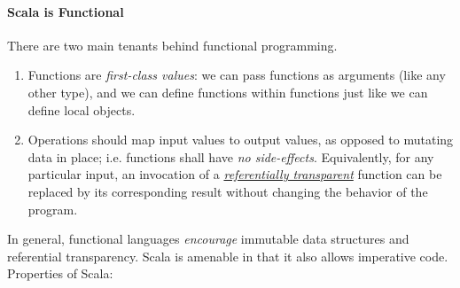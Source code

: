 \documentclass[12pt,letterpaper,twoside]{article}
\begin{document}
\paragraph{Scala is Functional} There are two main tenants behind functional programming.
\begin{enumerate}   \item Functions are \emph{first-class values}: we can pass functions 
    as arguments (like any
    other type), and we can define functions within functions just like we can
    define local objects.
  \item Operations should map input values to output values, as opposed to mutating data
    in place; i.e. functions shall have \emph{no side-effects}. Equivalently,
    for any particular input, an invocation of a 
    \href{https://en.wikipedia.org/wiki/Referential_transparency}
    {\emph{referentially transparent}}
    function can be replaced by its corresponding result without 
    changing the behavior of the program. 
\end{enumerate}

\vspace{-1.5ex}
In general, functional languages \emph{encourage} immutable data structures and 
referential transparency. Scala is amenable in that it also allows imperative code. 
Properties of Scala:
\end{document}
